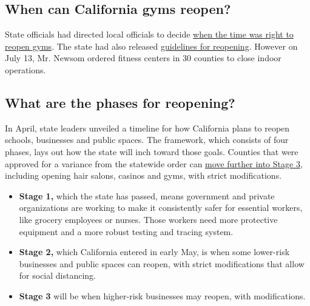 \hypertarget{when-can-california-gyms-reopen}{%
\subsection{When can California gyms
reopen?}\label{when-can-california-gyms-reopen}}

State officials had directed local officials to decide
\href{http://www.oesnews.com/california-public-health-officials-provide-covid-19-update/}{when
the time was right to reopen gyms}. The state had also released
\href{https://files.covid19.ca.gov/pdf/guidance-fitness.pdf}{guidelines
for reopening}. However on July 13, Mr. Newsom ordered fitness centers
in 30 counties to close indoor operations.

\hypertarget{what-are-the-phases-for-reopening}{%
\subsection{What are the phases for
reopening?}\label{what-are-the-phases-for-reopening}}

In April, state leaders unveiled a timeline for how California plans to
reopen schools, businesses and public spaces. The framework, which
consists of four phases, lays out how the state will inch toward those
goals. Counties that were approved for a variance from the statewide
order can
\href{https://www.cdph.ca.gov/Programs/CID/DCDC/Pages/COVID-19/County_Variance_Attestation_Form.aspx}{move
further into Stage 3}, including opening hair salons, casinos and gyms,
with strict modifications.

\begin{itemize}
\tightlist
\item
  \textbf{Stage 1,} which the state has passed, means government and
  private organizations are working to make it consistently safer for
  essential workers, like grocery employees or nurses. Those workers
  need more protective equipment and a more robust testing and tracing
  system.
\end{itemize}

\begin{itemize}
\tightlist
\item
  \textbf{Stage 2,} which California entered in early May, is when some
  lower-risk businesses and public spaces can reopen, with strict
  modifications that allow for social distancing.
\end{itemize}

\begin{itemize}
\tightlist
\item
  \textbf{Stage 3} will be when higher-risk businesses may reopen, with
  modifications.
\end{itemize}

